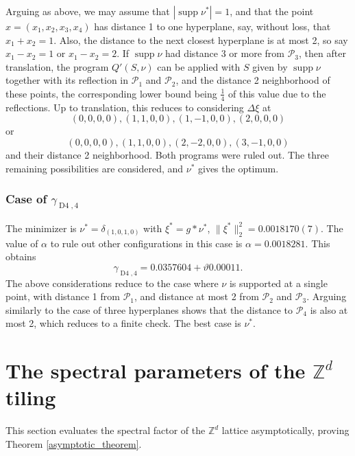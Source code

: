 \documentclass[a4paper, 12pt, notitlepage]{amsart}
\newcommand{\Dfour}{\operatorname{D4}}
\newcommand{\supp}{\operatorname{supp}}
\newcommand{\zed}{\mathbb{Z}}
\newcommand{\sP}{{\mathscr{P}}}
\theoremstyle{remark}
\begin{document}
Arguing as above, we may assume that $|\supp \nu^*| = 1$, and that the point $x = (x_1, x_2, x_3, x_4)$ has distance 1 to one hyperplane, say, without loss, that $x_1 + x_2 = 1$.  Also, the distance to the next closest hyperplane is at most 2, so say $x_1 - x_2 = 1$ or $x_1 - x_2 = 2$.  If $\supp \nu$ had distance 3 or more from $\sP_3$, then after translation, the program $Q'(S, \nu)$ can be applied with $S$ given by $\supp \nu$ together with its reflection in $\sP_1$ and $\sP_2$, and the distance 2 neighborhood of these points, the corresponding lower bound being $\frac{1}{4}$ of this value due to the reflections.   Up to translation, this reduces to considering $\Delta \xi$ at \[(0,0,0,0), (1,1,0,0), (1,-1,0,0), (2,0,0,0)\] or \[(0,0,0,0), (1,1,0,0), (2,-2,0,0), (3,-1,0,0)\] and their distance 2 neighborhood.  Both programs were ruled out.  The three remaining possibilities are considered, and $\nu^*$ gives the optimum. 

\subsubsection*{Case of $\gamma_{\Dfour,4}$}
   The minimizer is $\nu^* = \delta_{(1,0,1,0)}$ with $\xi^* = g*\nu^*$, $\|\xi^*\|_2^2 = 0.0018170(7)$. The value of $\alpha$ to rule out other configurations in this case is $\alpha = 0.0018281$. This obtains
\begin{equation*}
 \gamma_{\Dfour,4} = 0.0357604+ \vartheta 0.00011.
\end{equation*}
      The above considerations reduce to the case where $\nu$ is supported at a single point, with distance 1 from $\sP_1$, and distance at most 2 from $\sP_2$ and $\sP_3$.  Arguing similarly to the case of three hyperplanes shows that the distance to $\sP_4$ is also at most 2, which reduces to a finite check.  The best case is $\nu^*$.  


\section{The spectral parameters of the $\zed^d$ tiling} \label{zd_section}

This section evaluates the spectral factor of the $\zed^d$ lattice asymptotically, proving Theorem \ref{asymptotic_theorem}.
\end{document}
